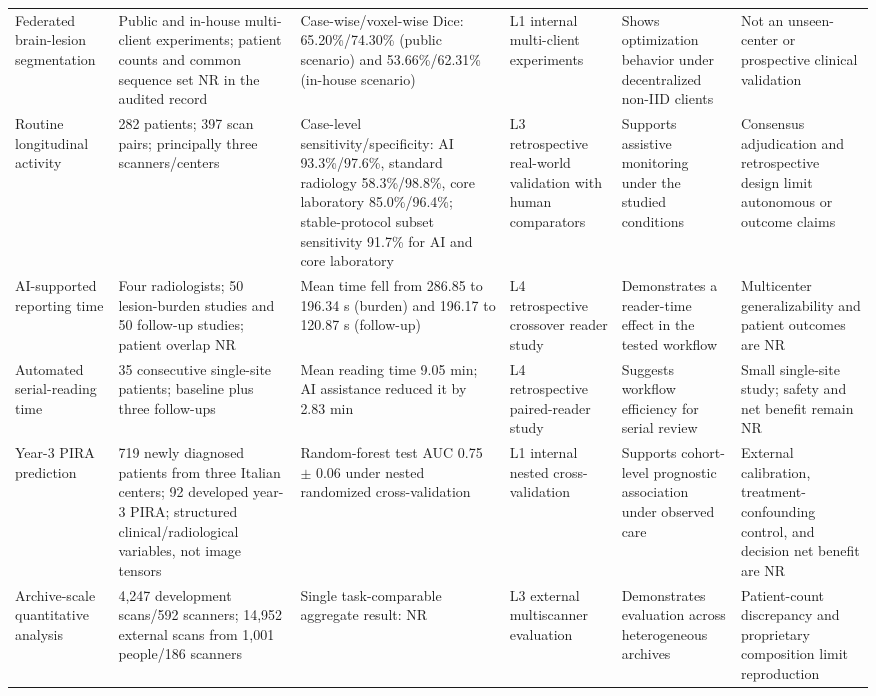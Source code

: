 \documentclass[journal,twoside,web]{ieeecolor}
\begin{document}
\begin{table}[!t]
\begin{tabularx}{\textwidth}{@{}ZZZZZZ@{}}
Federated brain-lesion segmentation \cite{federated_ms} & Public and in-house multi-client experiments; patient counts and common sequence set NR in the audited record & Case-wise/voxel-wise Dice: 65.20\%/74.30\% (public scenario) and 53.66\%/62.31\% (in-house scenario) & L1 internal multi-client experiments & Shows optimization behavior under decentralized non-IID clients & Not an unseen-center or prospective clinical validation \\
Routine longitudinal activity \cite{barnett} & 282 patients; 397 scan pairs; principally three scanners/centers & Case-level sensitivity/specificity: AI 93.3\%/97.6\%, standard radiology 58.3\%/98.8\%, core laboratory 85.0\%/96.4\%; stable-protocol subset sensitivity 91.7\% for AI and core laboratory & L3 retrospective real-world validation with human comparators & Supports assistive monitoring under the studied conditions & Consensus adjudication and retrospective design limit autonomous or outcome claims \\
AI-supported reporting time \cite{peters2024} & Four radiologists; 50 lesion-burden studies and 50 follow-up studies; patient overlap NR & Mean time fell from 286.85 to 196.34 s (burden) and 196.17 to 120.87 s (follow-up) & L4 retrospective crossover reader study & Demonstrates a reader-time effect in the tested workflow & Multicenter generalizability and patient outcomes are NR \\
Automated serial-reading time \cite{sieber} & 35 consecutive single-site patients; baseline plus three follow-ups & Mean reading time 9.05 min; AI assistance reduced it by 2.83 min & L4 retrospective paired-reader study & Suggests workflow efficiency for serial review & Small single-site study; safety and net benefit remain NR \\
Year-3 PIRA prediction \cite{poretto} & 719 newly diagnosed patients from three Italian centers; 92 developed year-3 PIRA; structured clinical/radiological variables, not image tensors & Random-forest test AUC 0.75 $\pm$ 0.06 under nested randomized cross-validation & L1 internal nested cross-validation & Supports cohort-level prognostic association under observed care & External calibration, treatment-confounding control, and decision net benefit are NR \\
Archive-scale quantitative analysis \cite{mindglide} & 4,247 development scans/592 scanners; 14,952 external scans from 1,001 people/186 scanners & Single task-comparable aggregate result: NR & L3 external multiscanner evaluation & Demonstrates evaluation across heterogeneous archives & Patient-count discrepancy and proprietary composition limit reproduction \\
\bottomrule
\end{tabularx}
\end{table}
\end{document}
